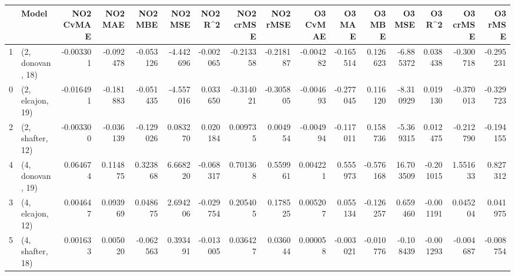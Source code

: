 \begin{tabular}{llrrrrrrrrrrrrrr}
\toprule
{} &             Model &  NO2 CvMAE &   NO2 MAE &   NO2 MBE &   NO2 MSE &   NO2 R\textasciicircum2 &  NO2 crMSE &  NO2 rMSE &  O3 CvMAE &    O3 MAE &    O3 MBE &     O3 MSE &    O3 R\textasciicircum2 &  O3 crMSE &   O3 rMSE \\
\midrule
1 &  (2, donovan, 18) &  -0.003301 & -0.092478 & -0.053126 & -4.442696 & -0.002065 &  -0.213358 & -0.218187 & -0.004282 & -0.165514 &  0.126623 &  -6.885372 &  0.038438 & -0.300718 & -0.295231 \\
0 &  (2, elcajon, 19) &  -0.016491 & -0.181883 & -0.051435 & -4.557016 &  0.033650 &  -0.314021 & -0.305805 & -0.004693 & -0.277045 &  0.116120 &  -8.310929 &  0.019130 & -0.370013 & -0.329723 \\
2 &  (2, shafter, 12) &  -0.003300 & -0.036139 & -0.129026 &  0.083270 &  0.020184 &   0.009735 &  0.004954 & -0.004994 & -0.117011 &  0.158736 &  -5.369315 &  0.012475 & -0.212790 & -0.194155 \\
4 &  (4, donovan, 19) &   0.064674 &  0.114875 &  0.323868 &  6.668220 & -0.068317 &   0.701368 &  0.559961 &  0.004221 &  0.555973 & -0.576168 &  16.703509 & -0.201015 &  1.551633 &  0.827312 \\
3 &  (4, elcajon, 12) &   0.004647 &  0.093969 &  0.048675 &  2.694206 & -0.029754 &   0.205405 &  0.178525 &  0.005207 &  0.055134 & -0.126257 &   0.659460 & -0.001191 &  0.045204 &  0.041975 \\
5 &  (4, shafter, 18) &   0.001633 &  0.005020 & -0.062563 &  0.393491 & -0.013005 &   0.036427 &  0.036044 &  0.000058 & -0.003021 & -0.010776 &  -0.108439 & -0.001293 & -0.004687 & -0.008754 \\
\bottomrule
\end{tabular}
